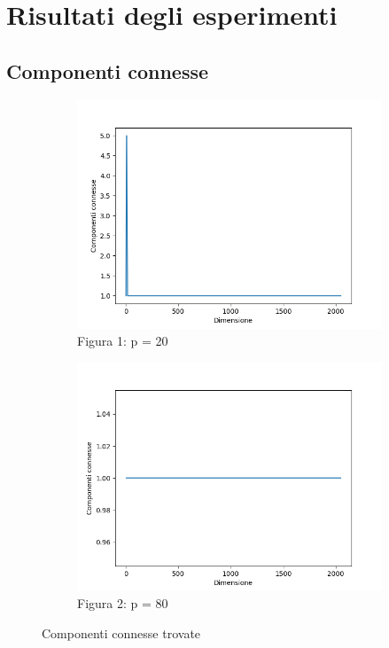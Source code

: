 \documentclass[
]{article}
\begin{document}
\hypertarget{risultati-degli-esperimenti}{%
\section{Risultati degli
esperimenti}\label{risultati-degli-esperimenti}}

\hypertarget{componenti-connesse-1}{%
\subsection{Componenti connesse}\label{componenti-connesse-1}}
\begin{figure}[h!]
	\centering
	\begin{subfigure}[b]{0.4\linewidth}
		\includegraphics[width=\linewidth]{../img/cc/cc_number_p=20.png}
		\caption{Figura 1: p = 20}
	\end{subfigure}
	\begin{subfigure}[b]{0.4\linewidth}
		\includegraphics[width=\linewidth]{../img/cc/cc_number_p=80.png}
		\caption{Figura 2: p = 80}
	\end{subfigure}
	\caption{Componenti connesse trovate}
	\label{fig:CC_1}
\end{figure}
\end{document}
